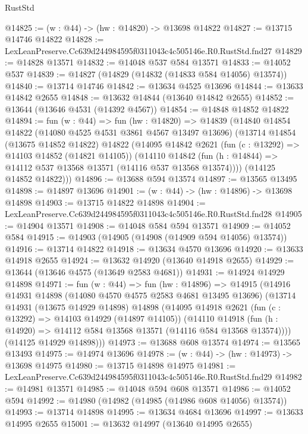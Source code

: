 \begin{lexlean}{RustStd}
\begin{coremodule}
@14825 := (w : @44) -> (hw : @14820) -> @13698 @14822
@14827 := @13715 @14746 @14822
@14828 := LexLeanPreserve.Cc639d244984595f0311043c4c505146e.R0.RustStd.fnd27
@14829 := @14828 @13571
@14832 := @14048 @537 @584 @13571
@14833 := @14052 @537
@14839 := @14827 (@14829 (@14832 (@14833 @584 @14056) @13574))
@14840 := @13714 @14746
@14842 := @13634 @4525 @13696
@14844 := @13633 @14842 @2655
@14848 := @13632 @14844 (@13640 @14842 @2655)
@14852 := @13644 (@13646 @4531 (@14392 @4567))
@14854 := @14848 @14852 @14822
@14894 := fun (w : @44) =>
  fun (hw : @14820) =>
  @14839
    (@14840
      @14854
      @14822
      (@14080 @4525 @4531 @3861 @4567 @13497 @13696)
      (@13714
        @14854
        (@13675 @14852 @14822)
        @14822
        (@14095
          @14842
          @2621
          (fun (c : @13292) => @14103 @14852 (@14821 @14105))
          (@14110
            @14842
            (fun (h : @14844) => @14112 @537 @13568 @13571 (@14116 @537 @13568 @13574))))
        (@14125 @14852 @14822)))
@14896 := @13688 @594 @13574
@14897 := @13565 @13495
@14898 := @14897 @13696
@14901 := (w : @44) -> (hw : @14896) -> @13698 @14898
@14903 := @13715 @14822 @14898
@14904 := LexLeanPreserve.Cc639d244984595f0311043c4c505146e.R0.RustStd.fnd28
@14905 := @14904 @13571
@14908 := @14048 @584 @594 @13571
@14909 := @14052 @584
@14915 := @14903 (@14905 (@14908 (@14909 @594 @14056) @13574))
@14916 := @13714 @14822
@14918 := @13634 @4570 @13696
@14920 := @13633 @14918 @2655
@14924 := @13632 @14920 (@13640 @14918 @2655)
@14929 := @13644 (@13646 @4575 (@13649 @2583 @4681))
@14931 := @14924 @14929 @14898
@14971 := fun (w : @44) =>
  fun (hw : @14896) =>
  @14915
    (@14916
      @14931
      @14898
      (@14080 @4570 @4575 @2583 @4681 @13495 @13696)
      (@13714
        @14931
        (@13675 @14929 @14898)
        @14898
        (@14095
          @14918
          @2621
          (fun (c : @13292) => @14103 @14929 (@14897 @14105))
          (@14110
            @14918
            (fun (h : @14920) => @14112 @584 @13568 @13571 (@14116 @584 @13568 @13574))))
        (@14125 @14929 @14898)))
@14973 := @13688 @608 @13574
@14974 := @13565 @13493
@14975 := @14974 @13696
@14978 := (w : @44) -> (hw : @14973) -> @13698 @14975
@14980 := @13715 @14898 @14975
@14981 := LexLeanPreserve.Cc639d244984595f0311043c4c505146e.R0.RustStd.fnd29
@14982 := @14981 @13571
@14985 := @14048 @594 @608 @13571
@14986 := @14052 @594
@14992 := @14980 (@14982 (@14985 (@14986 @608 @14056) @13574))
@14993 := @13714 @14898
@14995 := @13634 @4684 @13696
@14997 := @13633 @14995 @2655
@15001 := @13632 @14997 (@13640 @14995 @2655)

\end{coremodule}
\end{lexlean}
